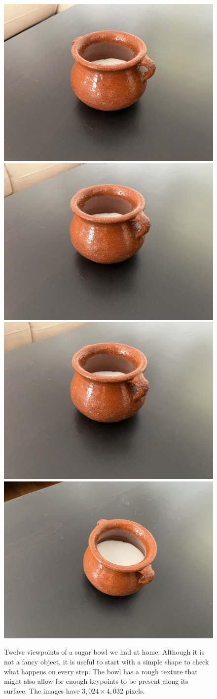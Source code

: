 \begin{figure}[t]
{} 
\centerline{
\includegraphics[width=.24\linewidth]{figures/sfm/sugar/IMG_1497.jpeg}
\includegraphics[width=.24\linewidth]{figures/sfm/sugar/IMG_1498.jpeg}
\includegraphics[width=.24\linewidth]{figures/sfm/sugar/IMG_1499.jpeg}
\includegraphics[width=.24\linewidth]{figures/sfm/sugar/IMG_1500.jpeg}
} 
\caption{Twelve viewpoints of a sugar bowl we had at home. Although it is not a fancy object, it is useful to start with a simple shape to check what happens on every step. The bowl has a rough texture that might also allow for enough keypoints to be present along its surface. The images have $3,024 \times 4,032$ pixels.}
\label{fig:sfm:sugar}
\end{figure}


